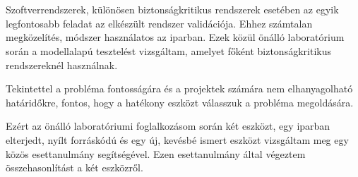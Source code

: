 \chapter{\bevezetes}

Szoftverrendszerek, különösen biztonságkritikus rendszerek esetében az egyik legfontosabb feladat az elkészült rendszer validációja. Ehhez számtalan megközelítés, módszer használatos az iparban. Ezek közül önálló laboratórium során a modellalapú tesztelést vizsgáltam, amelyet főként biztonságkritikus rendszereknél használnak.

Tekintettel a probléma fontosságára és a projektek számára nem elhanyagolható határidőkre, fontos, hogy a hatékony eszközt válasszuk a probléma megoldására.

Ezért az önálló laboratóriumi foglalkozásom során két eszközt, egy iparban elterjedt, nyílt forráskódú és egy új, kevésbé ismert eszközt vizsgáltam meg egy közös esettanulmány segítségével. Ezen esettanulmány által végeztem összehasonlítást a két eszközről.
